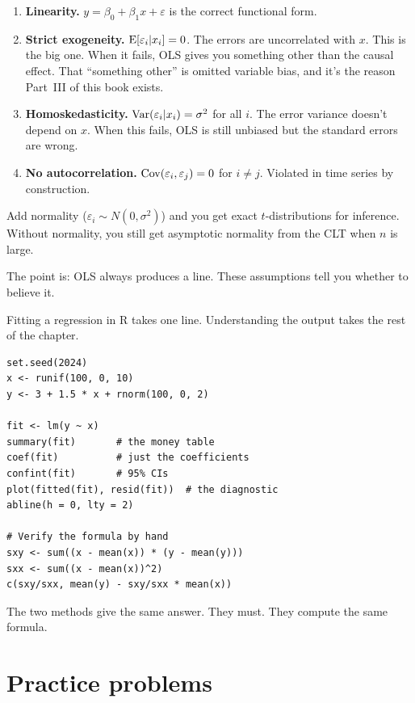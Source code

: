 \begin{enumerate}
  \item \textbf{Linearity.} $y = \beta_0 + \beta_1 x + \varepsilon$ is the correct functional form.
  \item \textbf{Strict exogeneity.} $\operatorname{E}[\varepsilon_i | x_i] = 0$. The errors are uncorrelated with $x$. This is the big one. When it fails, OLS gives you something other than the causal effect. That ``something other'' is omitted variable bias, and it's the reason Part~III of this book exists.
  \item \textbf{Homoskedasticity.} $\operatorname{Var}(\varepsilon_i | x_i) = \sigma^2$ for all $i$. The error variance doesn't depend on $x$. When this fails, OLS is still unbiased but the standard errors are wrong.
  \item \textbf{No autocorrelation.} $\operatorname{Cov}(\varepsilon_i, \varepsilon_j) = 0$ for $i \neq j$. Violated in time series by construction.
\end{enumerate}

Add normality ($\varepsilon_i \sim N(0, \sigma^2)$) and you get exact $t$-distributions for inference. Without normality, you still get asymptotic normality from the CLT when $n$ is large.

The point is: OLS always produces a line. These assumptions tell you whether to believe it.

\begin{codelab}
Fitting a regression in R takes one line. Understanding the output takes the rest of the chapter.
\begin{lstlisting}[language=Rlang]
set.seed(2024)
x <- runif(100, 0, 10)
y <- 3 + 1.5 * x + rnorm(100, 0, 2)

fit <- lm(y ~ x)
summary(fit)       # the money table
coef(fit)          # just the coefficients
confint(fit)       # 95% CIs
plot(fitted(fit), resid(fit))  # the diagnostic
abline(h = 0, lty = 2)

# Verify the formula by hand
sxy <- sum((x - mean(x)) * (y - mean(y)))
sxx <- sum((x - mean(x))^2)
c(sxy/sxx, mean(y) - sxy/sxx * mean(x))
\end{lstlisting}
The two methods give the same answer. They must. They compute the same formula.
\end{codelab}

\section{Practice problems}

